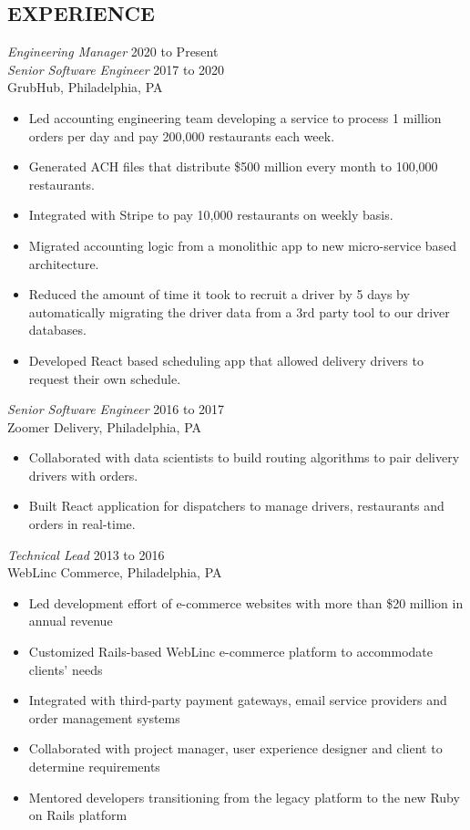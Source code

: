 \documentclass[line]{style}
\begin{document}
\newsectionwidth{0in}

\address{michaelcdalton@gmail.com}
\address{linkedin.com/in/michaelcdalton}

\begin{resume}

\section{EXPERIENCE}

{\sl Engineering Manager} \hfill 2020 to Present \\
{\sl Senior Software Engineer} \hfill 2017 to 2020 \\
GrubHub, Philadelphia, PA
\begin{itemize} \itemsep -2pt
\item Led accounting engineering team developing a service to process 1 million orders per day and pay 200,000 restaurants each week.
\item Generated ACH files that distribute \$500 million every month to 100,000 restaurants.
\item Integrated with Stripe to pay 10,000 restaurants on weekly basis.
\item Migrated accounting logic from a monolithic app to new micro-service based architecture.
\item Reduced the amount of time it took to recruit a driver by 5 days by automatically migrating the driver data from a 3rd party tool to our driver databases.
\item Developed React based scheduling app that allowed delivery drivers to request their own schedule.
\end{itemize}

{\sl Senior Software Engineer} \hfill 2016 to 2017 \\
Zoomer Delivery, Philadelphia, PA
\begin{itemize} \itemsep -2pt
\item Collaborated with data scientists to build routing algorithms to pair delivery drivers with orders.
\item Built React application for dispatchers to manage drivers, restaurants and orders in real-time.
\end{itemize}

{\sl Technical Lead} \hfill 2013 to 2016 \\
WebLinc Commerce, Philadelphia, PA
\begin{itemize} \itemsep -2pt
\item Led development effort of e-commerce websites with more than \$20 million in annual revenue
\item Customized Rails-based WebLinc e-commerce platform to accommodate clients' needs
\item Integrated with third-party payment gateways, email service providers and order management systems
\item Collaborated with project manager, user experience designer and client to determine requirements
\item Mentored developers transitioning from the legacy platform to the new Ruby on Rails platform
\end{itemize}


\end{resume}
\end{document}
